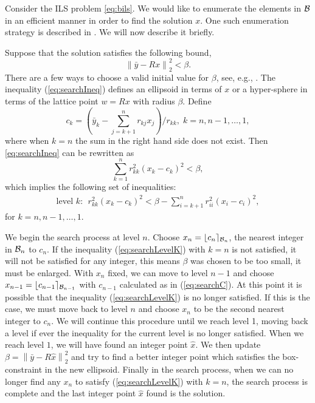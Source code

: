 \documentclass[conference]{IEEEtran}
\begin{document}
Consider the ILS problem \eqref{eq:bils}. We would like to enumerate the
elements in ${\cal B}$ in an efficient manner in order to find the solution $x$.
One such enumeration strategy is described in \cite{ChaH05}. We will now
describe it briefly.

Suppose that the solution satisfies the following bound, 
\begin{equation}
\left \| \bar{y} - Rx \right \|_2^2 < \beta.
\label{eq:searchIneq}
\end{equation}
There are a few ways to choose a valid initial value for $\beta$, see, e.g.,
\cite{ChaH05}. The inequality (\ref{eq:searchIneq}) defines an ellipsoid in terms of $x$ 
or a hyper-sphere in terms of the lattice point $w=Rx$ with radius $\beta$. 
Define
\begin{equation}
 c_k = (\bar{y}_k - \sum_{j=k+1}^nr_{kj}x_j)/r_{kk}, \; k=n, n-1,\ldots, 1,
\label{eq:searchC}
\end{equation}
where when $k=n$ the sum in the right hand side does not exist.
Then \eqref{eq:searchIneq} can be rewritten as
$$
\sum_{k=1}^n r_{kk}^2(x_k-c_k)^2 < \beta,
$$
which implies the following
set of inequalities:
\begin{align}
\text{level } k: \ \ r_{kk}^2(x_k-c_k)^2 < \beta -
\sum_{i=k+1}^nr_{ii}^2(x_i-c_i)^2, \label{eq:searchLevelK} 
\end{align}
for $k=n,n-1,\ldots, 1$.

We begin the search process
at level $n$. Choose $x_n = \lfloor c_n \rceil_{{\cal B}_n}$, the nearest
integer in ${\cal B}_n$ to $c_n$. If the inequality (\ref{eq:searchLevelK}) with $k=n$
is not satisfied, it will not be satisfied for any integer, this means $\beta$
was chosen to be too small, it must be enlarged. With $x_n$ fixed, we can move
to level $n-1$ and choose $x_{n-1} = \lfloor c_{n-1} \rceil_{{\cal B}_{n-1}}$ with $c_{n-1}$ calculated as in (\ref{eq:searchC}). At this point it
is possible that the inequality (\ref{eq:searchLevelK}) is no longer satisfied.
If this is the case, we must move back to level $n$ and choose $x_n$ to be the
second nearest integer to $c_n$.  We will continue this procedure until we reach
level 1, moving back a level if ever the inequality for the current level is no
longer satisfied.
When we reach level $1$, we will have found an integer point $\hat{x}$. We then
update $\beta = \left \| \bar{y} - R\hat{x} \right \|_2^2$ and try
to find a better integer point which satisfies the box-constraint in the new
ellipsoid. Finally in the search process, when we can no longer find any $x_n$
to satisfy (\ref{eq:searchLevelK}) with $k=n$, the search process is complete and the last integer
point $\hat{x}$ found is the solution. %
\end{document}
